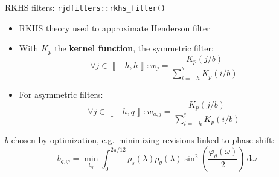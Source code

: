 \documentclass[10pt,xcolor=table,color={dvipsnames,usenames},ignorenonframetext,usepdftitle=false,english]{beamer}
\providecommand{\tightlist}{%
  \setlength{\parskip}{0pt}
  }
\newcommand\1{\mathds{1}}
\newcommand\ud{\,\mathrm{d}}
\begin{document}
\begin{frame}{RKHS filters: 
\texttt{rjdfilters::rkhs\_filter()}}
\protect\hypertarget{rkhs-filters-rjdfiltersrkhs_filter}{}
\begin{itemize}
\item
  RKHS theory used to approximate Henderson filter
\item
  With \(K_p\) the \textbf{kernel function}, the symmetric filter: \[
  \forall j\in\left\llbracket -h,h\right\rrbracket: w_{j}=\frac{K_p(j/b)}{\sum_{i=-h}^{^h}K_p(i/b)}
  \]
\end{itemize}


\pause

\begin{itemize}
\tightlist
\item
  For asymmetric filters: \[
  \forall j\in\left\llbracket -h,q\right\rrbracket: w_{a,j}=\frac{K_p(j/b)}{\sum_{i=-h}^{^q}K_p(i/b)}
  \]
\end{itemize}

\pause\pause\faArrowCircleRight{} \(b\) chosen by optimization,
e.g.~minimizing revisions linked to phase-shift:
\[b_{q,\varphi}=\underset{b_q}{\min}
\int_{0}^{2\pi/12}
\rho_s(\lambda)\rho_\theta(\lambda)\sin^{2}\left(\frac{\varphi_\theta(\omega)}{2}\right)\ud \omega\]
\end{frame}
\end{document}

